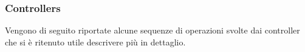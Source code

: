 \subsubsection{Controllers}
Vengono di seguito riportate alcune sequenze di operazioni svolte dai controller che si è ritenuto utile descrivere più in dettaglio.